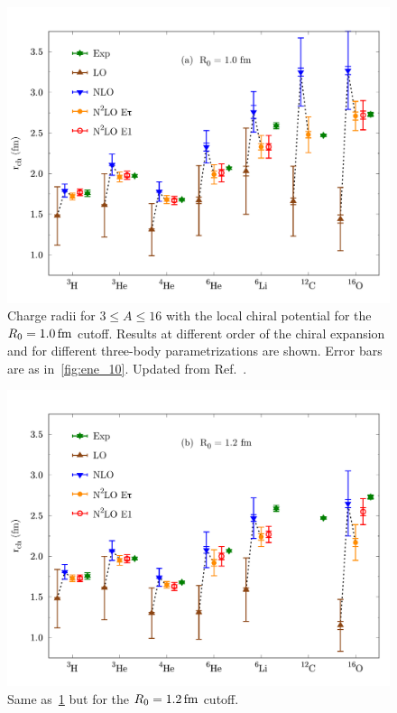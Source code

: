 \documentclass[aps,prc,twocolumn,superscriptaddress,floatfix]{revtex4-1}
\begin{document}
\begin{figure}[htb]
\includegraphics[width=\linewidth]{rch_10.pdf}
\caption[]{Charge radii for $3\le A\le16$ with the local chiral potential 
for the $R_0=1.0\,\rm fm$ cutoff. Results at different order of the chiral expansion 
and for different three-body parametrizations are shown.
Error bars are as in~\cref{fig:ene_10}. Updated from Ref.~\cite{Lonardoni:2017afdmc}.}
\label{fig:rch_10}
\end{figure}

\begin{figure}[htb]
\includegraphics[width=\linewidth]{rch_12.pdf}
\caption[]{Same as~\cref{fig:rch_10} but for the $R_0=1.2\,\rm fm$ cutoff.}
\label{fig:rch_12}
\end{figure}
\end{document}
